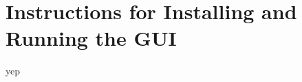 \documentclass[../main.tex]{subfiles}
\begin{document}
	\chapter{Instructions for Installing and Running the GUI} \label{appendix:GUI}
yep

\pagebreak
\end{document}
